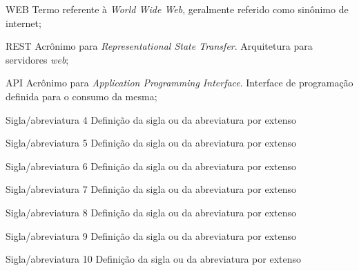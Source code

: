 \documentclass[
	12pt,				%
	oneside,			%
	a4paper,			%
	english,			%
	brazil				%
	]{abntex2ppgsi}
\begin{document}
%
%
\begin{siglas}
  \item[WEB] Termo referente à \textit{World Wide Web}, geralmente referido como sinônimo de internet;
  \item[REST] Acrônimo para \textit{Representational State Transfer}. Arquitetura para servidores \textit{web};
  \item[API] Acrônimo para \textit{Application Programming Interface}. Interface de programação definida para o consumo da mesma;
  \item[Sigla/abreviatura 4] Definição da sigla ou da abreviatura por extenso
  \item[Sigla/abreviatura 5] Definição da sigla ou da abreviatura por extenso
  \item[Sigla/abreviatura 6] Definição da sigla ou da abreviatura por extenso
  \item[Sigla/abreviatura 7] Definição da sigla ou da abreviatura por extenso
  \item[Sigla/abreviatura 8] Definição da sigla ou da abreviatura por extenso
  \item[Sigla/abreviatura 9] Definição da sigla ou da abreviatura por extenso
  \item[Sigla/abreviatura 10] Definição da sigla ou da abreviatura por extenso
\end{siglas}


\tableofcontents*
\cleardoublepage

\textual



% 
%
%
\end{document}
